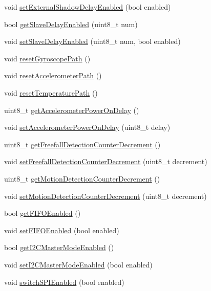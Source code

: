 \begin{DoxyCompactItemize}
\item 
void \hyperlink{classMPU6050_a9160193d883871037c6535a9d3e02ee2}{set\+External\+Shadow\+Delay\+Enabled} (bool enabled)
\item 
bool \hyperlink{classMPU6050_ae84fd795630f9ab5e8d6b19a616a11ce}{get\+Slave\+Delay\+Enabled} (uint8\+\_\+t num)
\item 
void \hyperlink{classMPU6050_a471929d7cf9049357c345633d22412a9}{set\+Slave\+Delay\+Enabled} (uint8\+\_\+t num, bool enabled)
\item 
void \hyperlink{classMPU6050_af1599c0d70f07fd3e28683d571842c22}{reset\+Gyroscope\+Path} ()
\item 
void \hyperlink{classMPU6050_a99ee74708c12f32e48ef5ec69ac9f4a9}{reset\+Accelerometer\+Path} ()
\item 
void \hyperlink{classMPU6050_a559c2d091d36a4e0489bc639916ddbb6}{reset\+Temperature\+Path} ()
\item 
uint8\+\_\+t \hyperlink{classMPU6050_aae903df2accc687423f9cd0a78f9cd32}{get\+Accelerometer\+Power\+On\+Delay} ()
\item 
void \hyperlink{classMPU6050_a2bbde7653d2d2d37e16e515599f3b08b}{set\+Accelerometer\+Power\+On\+Delay} (uint8\+\_\+t delay)
\item 
uint8\+\_\+t \hyperlink{classMPU6050_af6d6fa9869636989a8b29c4827ad7de8}{get\+Freefall\+Detection\+Counter\+Decrement} ()
\item 
void \hyperlink{classMPU6050_a18dd79b7c53600e9ce97eed4bfe6cf15}{set\+Freefall\+Detection\+Counter\+Decrement} (uint8\+\_\+t decrement)
\item 
uint8\+\_\+t \hyperlink{classMPU6050_a0ed8de8eb440dbfdec829297527b0da6}{get\+Motion\+Detection\+Counter\+Decrement} ()
\item 
void \hyperlink{classMPU6050_a74cc3ea727afa5d4406175085e60d08c}{set\+Motion\+Detection\+Counter\+Decrement} (uint8\+\_\+t decrement)
\item 
bool \hyperlink{classMPU6050_ae2687a09ebe0d7fbbf74f560e0dd9a44}{get\+F\+I\+F\+O\+Enabled} ()
\item 
void \hyperlink{classMPU6050_a78e58ab27986db6999af775ed4d43091}{set\+F\+I\+F\+O\+Enabled} (bool enabled)
\item 
bool \hyperlink{classMPU6050_a6b45e538f2082eb1b1975ed56e3e21bc}{get\+I2\+C\+Master\+Mode\+Enabled} ()
\item 
void \hyperlink{classMPU6050_a6503f0fdfefa0fd287a75032667b7b69}{set\+I2\+C\+Master\+Mode\+Enabled} (bool enabled)
\item 
void \hyperlink{classMPU6050_a269710b7bca814bbf67e7bb38c381650}{switch\+S\+P\+I\+Enabled} (bool enabled)

\end{DoxyCompactItemize}
